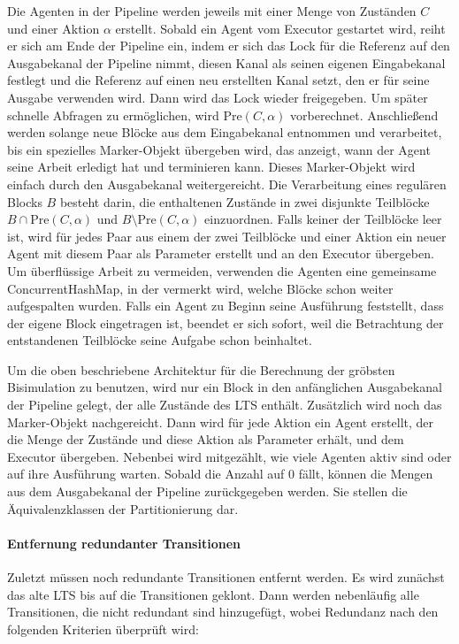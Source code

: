 \documentclass[a4paper]{scrartcl}
\begin{document}
Die Agenten in der Pipeline werden jeweils mit einer Menge von Zuständen $C$ und einer Aktion $\alpha$ erstellt. Sobald ein Agent vom Executor gestartet wird, reiht er sich am Ende der Pipeline ein, indem er sich das Lock für die Referenz auf den Ausgabekanal der Pipeline nimmt, diesen Kanal als seinen eigenen Eingabekanal festlegt und die Referenz auf einen neu erstellten Kanal setzt, den er für seine Ausgabe verwenden wird. Dann wird das Lock wieder freigegeben. Um später schnelle Abfragen zu ermöglichen, wird $\text{Pre}(C, \alpha)$ vorberechnet. Anschließend werden solange neue Blöcke aus dem Eingabekanal entnommen und verarbeitet, bis ein spezielles Marker-Objekt übergeben wird, das anzeigt, wann der Agent seine Arbeit erledigt hat und terminieren kann. Dieses Marker-Objekt wird einfach durch den Ausgabekanal weitergereicht. Die Verarbeitung eines regulären Blocks $B$ besteht darin, die enthaltenen Zustände in zwei disjunkte Teilblöcke $B \cap \text{Pre}(C, \alpha)$ und $B \setminus \text{Pre}(C, \alpha)$ einzuordnen. Falls keiner der Teilblöcke leer ist, wird für jedes Paar aus einem der zwei Teilblöcke und einer Aktion ein neuer Agent mit diesem Paar als Parameter erstellt und an den Executor übergeben. Um überflüssige Arbeit zu vermeiden, verwenden die Agenten eine gemeinsame ConcurrentHashMap, in der vermerkt wird, welche Blöcke schon weiter aufgespalten wurden. Falls ein Agent zu Beginn seine Ausführung feststellt, dass der eigene Block eingetragen ist, beendet er sich sofort, weil die Betrachtung der entstandenen Teilblöcke seine Aufgabe schon beinhaltet.

Um die oben beschriebene Architektur für die Berechnung der gröbsten Bisimulation zu benutzen, wird nur ein Block in den anfänglichen Ausgabekanal der Pipeline gelegt, der alle Zustände des LTS enthält. Zusätzlich wird noch das Marker-Objekt nachgereicht. Dann wird für jede Aktion ein Agent erstellt, der die Menge der Zustände und diese Aktion als Parameter erhält, und dem Executor übergeben. Nebenbei wird mitgezählt, wie viele Agenten aktiv sind oder auf ihre Ausführung warten. Sobald die Anzahl auf 0 fällt, können die Mengen aus dem Ausgabekanal der Pipeline zurückgegeben werden. Sie stellen die Äquivalenzklassen der Partitionierung dar.

\paragraph*{Entfernung redundanter Transitionen}
Zuletzt müssen noch redundante Transitionen entfernt werden. Es wird zunächst das alte LTS bis auf die Transitionen geklont. Dann werden nebenläufig alle Transitionen, die nicht redundant sind hinzugefügt, wobei Redundanz nach den folgenden Kriterien überprüft wird:
\end{document}
